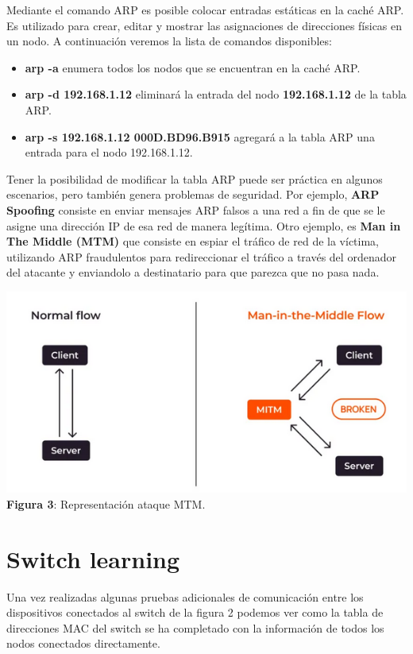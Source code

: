 \documentclass{article}
\begin{document}
    Mediante el comando ARP es posible colocar entradas estáticas en la caché ARP. Es utilizado para crear, editar y mostrar las asignaciones de direcciones físicas en un nodo. A continuación veremos la lista de comandos disponibles: \linebreak
    
    \begin{itemize}
        \item {\bfseries arp -a} enumera todos los nodos que se encuentran en la caché ARP.
        \item {\bfseries arp -d 192.168.1.12} eliminará la entrada del nodo {\bfseries 192.168.1.12} de la tabla ARP.
        \item {\bfseries arp -s 192.168.1.12 000D.BD96.B915} agregará a la tabla ARP una entrada para el nodo 192.168.1.12.
    \end{itemize}

    Tener la posibilidad de modificar la tabla ARP puede ser práctica en algunos escenarios, pero también genera problemas de seguridad. Por ejemplo, {\bfseries ARP Spoofing} consiste en enviar mensajes ARP falsos a una red a fin de que se le asigne una dirección IP de esa red de manera legítima. Otro ejemplo, es {\bfseries Man in The Middle (MTM)} que consiste en espiar el tráfico de red de la víctima, utilizando ARP fraudulentos para redireccionar el tráfico a través del ordenador del atacante y enviandolo a destinatario para que parezca que no pasa nada.

    \begin{center}
        \includegraphics[width=0.85\linewidth]{img_04} 
        \linebreak
        \small {\bfseries Figura 3}: Representación ataque MTM.
    \end{center}

    \section{Switch learning}
    Una vez realizadas algunas pruebas adicionales de comunicación entre los dispositivos conectados al switch de la figura 2 podemos ver como la tabla de direcciones MAC del switch se ha completado con la información de todos los nodos conectados directamente.
\end{document}
